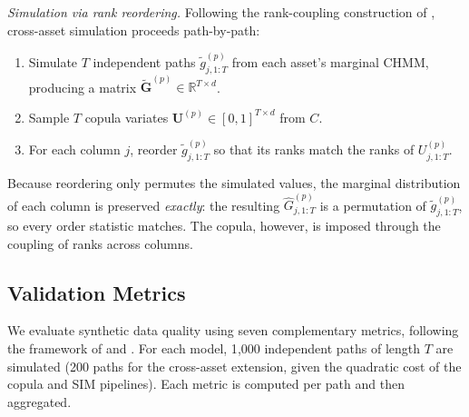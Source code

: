 \textit{Simulation via rank reordering.}
Following the rank-coupling construction of \citet{iman1982distribution}, cross-asset simulation proceeds path-by-path:
\begin{enumerate}
    \item Simulate $T$ independent paths $\tilde{g}_{j,1:T}^{(p)}$ from each asset's marginal CHMM, producing a matrix $\tilde{\mathbf{G}}^{(p)} \in \mathbb{R}^{T \times d}$.
    \item Sample $T$ copula variates $\mathbf{U}^{(p)} \in [0,1]^{T \times d}$ from $C$.
    \item For each column $j$, reorder $\tilde{g}_{j,1:T}^{(p)}$ so that its ranks match the ranks of $U_{j,1:T}^{(p)}$.
\end{enumerate}
Because reordering only permutes the simulated values, the marginal distribution of each column is preserved \emph{exactly}: the resulting $\hat{G}_{j,1:T}^{(p)}$ is a permutation of $\tilde{g}_{j,1:T}^{(p)}$, so every order statistic matches.
The copula, however, is imposed through the coupling of ranks across columns.

\subsection{Validation Metrics}
\label{sec:metrics}

We evaluate synthetic data quality using seven complementary metrics, following the framework of \cite{stenger2024thinking} and \cite{alswaidan2026hybrid}.
For each model, 1{,}000 independent paths of length $T$ are simulated (200 paths for the cross-asset extension, given the quadratic cost of the copula and SIM pipelines).
Each metric is computed per path and then aggregated.

